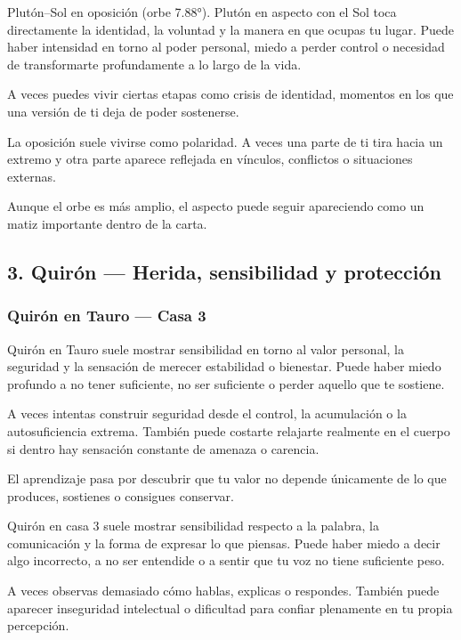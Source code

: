\documentclass[11pt,a4paper]{article}
\begin{document}
Plutón–Sol en oposición (orbe 7.88°).
Plutón en aspecto con el Sol toca directamente la identidad, la voluntad y la manera en que ocupas tu lugar. Puede haber intensidad en torno al poder personal, miedo a perder control o necesidad de transformarte profundamente a lo largo de la vida.

A veces puedes vivir ciertas etapas como crisis de identidad, momentos en los que una versión de ti deja de poder sostenerse.

La oposición suele vivirse como polaridad. A veces una parte de ti tira hacia un extremo y otra parte aparece reflejada en vínculos, conflictos o situaciones externas.

Aunque el orbe es más amplio, el aspecto puede seguir apareciendo como un matiz importante dentro de la carta.

\vspace{0.8cm}

\subsection{3. Quirón — Herida, sensibilidad y protección}

\subsubsection*{Quirón en Tauro — Casa 3}

Quirón en Tauro suele mostrar sensibilidad en torno al valor personal, la seguridad y la sensación de merecer estabilidad o bienestar. Puede haber miedo profundo a no tener suficiente, no ser suficiente o perder aquello que te sostiene.

A veces intentas construir seguridad desde el control, la acumulación o la autosuficiencia extrema. También puede costarte relajarte realmente en el cuerpo si dentro hay sensación constante de amenaza o carencia.

El aprendizaje pasa por descubrir que tu valor no depende únicamente de lo que produces, sostienes o consigues conservar.

Quirón en casa 3 suele mostrar sensibilidad respecto a la palabra, la comunicación y la forma de expresar lo que piensas. Puede haber miedo a decir algo incorrecto, a no ser entendide o a sentir que tu voz no tiene suficiente peso.

A veces observas demasiado cómo hablas, explicas o respondes. También puede aparecer inseguridad intelectual o dificultad para confiar plenamente en tu propia percepción.
\end{document}
